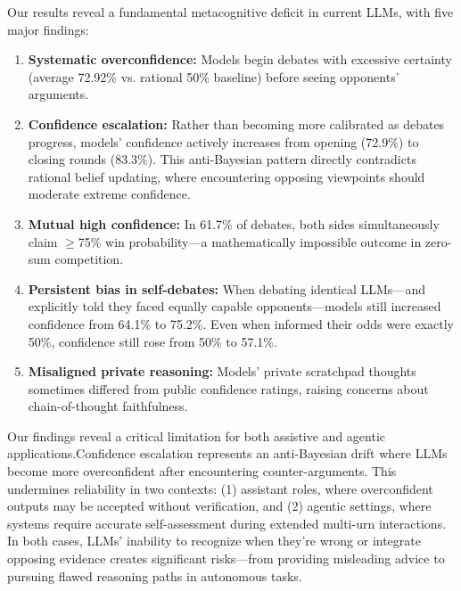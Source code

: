 \documentclass{article}
\begin{document}
Our results reveal a fundamental metacognitive deficit in current LLMs, with five major findings:

\begin{enumerate}
  \item \textbf{Systematic overconfidence:} Models begin debates with excessive certainty (average 72.92\% vs. rational 50\% baseline) before seeing opponents' arguments.

  \item \textbf{Confidence escalation:} Rather than becoming more calibrated as debates progress, models' confidence actively increases from opening (72.9\%) to closing rounds (83.3\%). This anti-Bayesian pattern directly contradicts rational belief updating, where encountering opposing viewpoints should moderate extreme confidence.

  \item \textbf{Mutual high confidence:} In 61.7\% of debates, both sides simultaneously claim $\geq$75\% win probability—a mathematically impossible outcome in zero-sum competition.

  \item \textbf{Persistent bias in self-debates:} When debating identical LLMs—and explicitly told they faced equally capable opponents—models still increased confidence from 64.1\% to 75.2\%. Even when informed their odds were exactly 50\%, confidence still rose from 50\% to 57.1\%.

  \item \textbf{Misaligned private reasoning:} Models' private scratchpad thoughts sometimes differed from public confidence ratings, raising concerns about chain-of-thought faithfulness.
\end{enumerate}

Our findings reveal a critical limitation for both assistive and agentic applications.Confidence escalation represents an anti-Bayesian drift where LLMs become more overconfident after encountering counter-arguments. This undermines reliability in two contexts: (1) assistant roles, where overconfident outputs may be accepted without verification, and (2) agentic settings, where systems require accurate self-assessment during extended multi-urn interactions. In both cases, LLMs' inability to recognize when they're wrong or integrate opposing evidence creates significant risks—from providing misleading advice to pursuing flawed reasoning paths in autonomous tasks.

\end{document}
